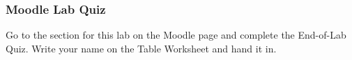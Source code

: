\documentclass[main.tex]{subfiles}
\begin{document}
\subsubsection{Moodle Lab Quiz}
Go to the section for this lab on the Moodle page and complete the End-of-Lab Quiz. Write your name on the Table Worksheet and hand it in.


\end{document}
